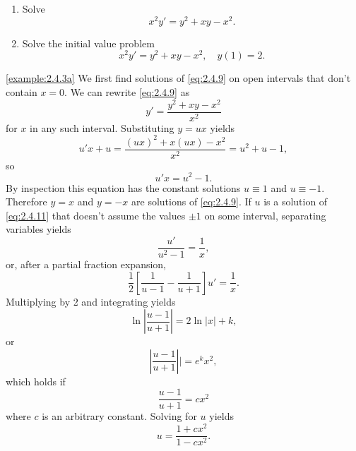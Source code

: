 \documentclass{ximera}
\begin{document}
\begin{example}\label{example:2.4.3}

\begin{enumerate}
\item\label{example:2.4.3a} %
Solve
\begin{equation} \label{eq:2.4.9}
x^2y'=y^2+xy-x^2.
\end{equation}

\item\label{example:2.4.3b} %
Solve the initial value problem
\begin{equation} \label{eq:2.4.10}
x^2y'=y^2+xy-x^2, \quad y(1)=2.
\end{equation}
\end{enumerate}

\begin{explanation}
\ref{example:2.4.3a} We first find solutions of \eqref{eq:2.4.9} on open intervals that don't
contain $x=0$. We can rewrite \eqref{eq:2.4.9} as
$$
y'=\frac{y^2+xy-x^2}{x^2}
$$
for $x$ in any such interval. Substituting $y=ux$ yields
$$
u'x+u =\frac{(ux)^2+x(ux)-x^2}{x^2}
= u^2+u-1,
$$
so
\begin{equation} \label{eq:2.4.11}
u'x=u^2-1.
\end{equation}
By inspection this equation has the constant solutions $u\equiv1$ and
$u\equiv-1$. Therefore $y=x$ and $y=-x$ are solutions of
\eqref{eq:2.4.9}. If $u$ is a solution of \eqref{eq:2.4.11} that doesn't
assume the values $\pm 1$ on some interval,  separating variables
yields
$$
\frac{u'}{u^2-1}=\frac{1}{x},
$$
 or, after a partial fraction expansion,
$$
{\frac{1}{2}}\left[\frac{1}{u-1}-\frac{1}{u+1}\right]u'=
\frac{1}{x}.
$$
 Multiplying by 2 and integrating yields
$$
\ln\left|\frac{u-1}{u+1}\right| =2 \ln |x|+k,
$$
 or
$$
\left|\frac{u-1}{u+1}\right||=e^kx^2,
$$
which holds if
\begin{equation} \label{eq:2.4.12}
\frac{u-1}{u+1}=cx^2
\end{equation}
where $c$ is an arbitrary constant.
  Solving for $u$ yields
$$
u =\frac{1+cx^2}{1-cx^2}.
$$



  



\end{explanation}
\end{example}
\end{document}
